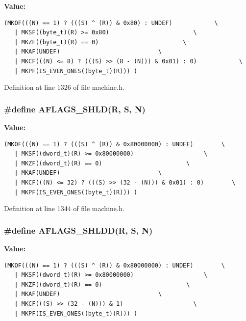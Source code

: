 \textbf{Value:}

\begin{Code}\begin{verbatim}(MKOF(((N) == 1) ? (((S) ^ (R)) & 0x80) : UNDEF)            \
   | MKSF((byte_t)(R) >= 0x80)                        \
   | MKZF((byte_t)(R) == 0)                        \
   | MKAF(UNDEF)                            \
   | MKCF(((N) <= 8) ? (((S) >> (8 - (N))) & 0x01) : 0)            \
   | MKPF(IS_EVEN_ONES((byte_t)(R))) )
\end{verbatim}
\end{Code}


Definition at line 1326 of file machine.h.
\subsubsection[{AFLAGS\_\-SHLD}]{\setlength{\rightskip}{0pt plus 5cm}\#define AFLAGS\_\-SHLD(R, \/  S, \/  N)}\label{machine_8h_0187c28643d4a6986a0ca4057719c5b0}


\textbf{Value:}

\begin{Code}\begin{verbatim}(MKOF(((N) == 1) ? (((S) ^ (R)) & 0x80000000) : UNDEF)        \
   | MKSF((dword_t)(R) >= 0x80000000)                    \
   | MKZF((dword_t)(R) == 0)                        \
   | MKAF(UNDEF)                            \
   | MKCF(((N) <= 32) ? (((S) >> (32 - (N))) & 0x01) : 0)        \
   | MKPF(IS_EVEN_ONES((byte_t)(R))) )
\end{verbatim}
\end{Code}


Definition at line 1344 of file machine.h.
\subsubsection[{AFLAGS\_\-SHLDD}]{\setlength{\rightskip}{0pt plus 5cm}\#define AFLAGS\_\-SHLDD(R, \/  S, \/  N)}\label{machine_8h_1c633b18156d5ad7eaeea572763dcd13}


\textbf{Value:}

\begin{Code}\begin{verbatim}(MKOF(((N) == 1) ? (((S) ^ (R)) & 0x80000000) : UNDEF)        \
   | MKSF((dword_t)(R) >= 0x80000000)                    \
   | MKZF((dword_t)(R) == 0)                        \
   | MKAF(UNDEF)                            \
   | MKCF(((S) >> (32 - (N))) & 1)                    \
   | MKPF(IS_EVEN_ONES((byte_t)(R))) )
\end{verbatim}
\end{Code}


